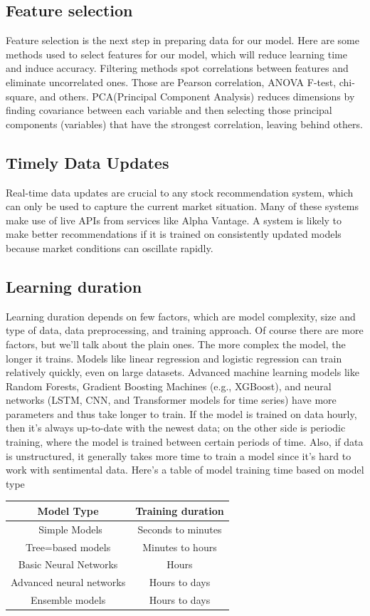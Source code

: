 \documentclass[10pt,twoside,english,a4paper]{article}
\begin{document}
\subsection{Feature selection}
Feature selection is the next step in preparing data for our model. Here are some methods used to select features for our model, which will reduce learning time and induce accuracy.
Filtering methods spot correlations between features and eliminate uncorrelated ones. Those are Pearson correlation, ANOVA F-test, chi-square, and others. PCA(Principal Component Analysis) reduces dimensions by finding covariance between each variable and then selecting those principal components (variables) that have the strongest correlation, leaving behind others.
\cite{data_preproc_feature_sel_time_updates}
\subsection{Timely Data Updates}
Real-time data updates are crucial to any stock recommendation system, which can only be used to capture the current market situation. Many of these systems make use of live APIs from services like Alpha Vantage. A system is likely to make better recommendations if it is trained on consistently updated models because market conditions can oscillate rapidly.\cite{up-to-date_data}
\subsection{Learning duration}
Learning duration depends on few factors, which are model complexity, size and type of data, data preprocessing, and training approach. Of course there are more factors, but we'll talk about the plain ones. The more complex the model, the longer it trains. Models like linear regression and logistic regression can train relatively quickly, even on large datasets. Advanced machine learning models like Random Forests, Gradient Boosting Machines (e.g., XGBoost), and neural networks (LSTM, CNN, and Transformer models for time series) have more parameters and thus take longer to train. If the model is trained on data hourly, then it's always up-to-date with the newest data; on the other side is periodic training, where the model is trained between certain periods of time. Also, if data is unstructured, it generally takes more time to train a model since it's hard to work with sentimental data.
Here's a table of model training time based on model type
\begin{center}
\begin{tabular}{|c | c|} 
 \hline
 Model Type & Training duration\\ [1ex] 
 \hline\
 Simple Models & Seconds to minutes \\ [1ex] 
 \hline
 Tree=based models& Minutes to hours\\ [1ex]
 \hline
 Basic Neural Networks & Hours\\ [1ex]
 \hline
 Advanced neural networks & Hours to days\\ [1ex] 
 \hline
 Ensemble models & Hours to days\\ [1ex]
 \hline
\end{tabular}
\end{center}\cite{train_t}
\end{document}
